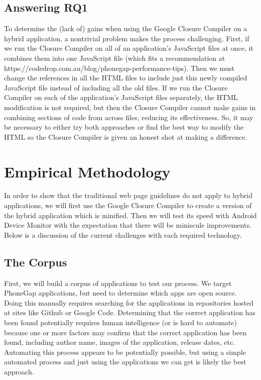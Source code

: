 \documentclass{acm_proc_article-sp}
\begin{document}
\subsection{Answering RQ1}
To determine the (lack of) gains when using the Google Closure Compiler on a hybrid application, a nontrivial problem makes the process challenging.
First, if we run the Closure Compiler on all of an application's JavaScript files at once, it combines them into one JavaScript file (which fits a recommendation at https://codedrop.com.au/blog/phonegap-performance-tips). 
Then we must change the references in all the HTML files to include just this newly compiled JavaScript file instead of including all the old files.
If we run the Closure Compiler on each of the application's JavaScript files separately, the HTML modification is not required, but then the Closure Compiler cannot make gains in combining sections of code from across files, reducing its effectiveness. 
So, it may be necessary to either try both approaches or find the best way to modify the HTML so the Closure Compiler is given an honest shot at making a difference.

\section{Empirical Methodology}
In order to show that the traditional web page guidelines do not apply to hybrid applications, we will first use the Google Closure Compiler to create a version of the hybrid application which is minified.
Then we will test its speed with Android Device Monitor with the expectation that there will be miniscule improvements.
Below is a discussion of the current challenges with each required technology.

\subsection{The Corpus}
First, we will build a corpus of applications to test our process. 
We target PhoneGap applications, but need to determine which apps are open source. 
Doing this manually requires searching for the applications in repositories hosted at sites like Github or Google Code.
Determining that the correct application has been found potentially requires human intelligence (or is hard to automate) because one or more factors may confirm that the correct application has been found, including author name, images of the application, release dates, etc.
Automating this process appears to be potentially possible, but using a simple automated process and just using the applications we can get is likely the best approach.
\end{document}
